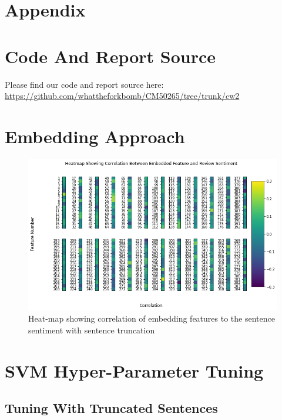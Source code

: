 \section*{\Large Appendix}
\appendix

\section{Code And Report Source}
Please find our code and report source here: \url{https://github.com/whattheforkbomb/CM50265/tree/trunk/cw2}

\section{Embedding Approach}
\begin{figure}[h!]
    \includegraphics[width=\textwidth]{figures/Feature_Correlation_Heatmap.png}
    \caption{\label{fig:feature_corr_hm_old} Heat-map showing correlation of embedding features to the sentence sentiment with sentence truncation}
\end{figure}

\section{SVM Hyper-Parameter Tuning}
\subsection{Tuning With Truncated Sentences}

